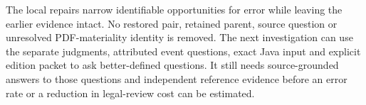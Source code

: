 The local repairs narrow identifiable opportunities for error while leaving
the earlier evidence intact. No restored pair, retained parent, source question
or unresolved PDF-materiality identity is removed. The next investigation can
use the separate judgments, attributed event questions, exact Java input and
explicit edition packet to ask better-defined questions. It still needs
source-grounded answers to those questions and independent reference evidence
before an error rate or a reduction in legal-review cost can be estimated.
